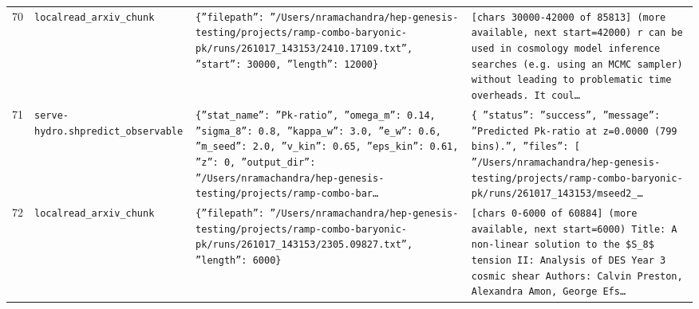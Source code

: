 \documentclass[11pt,a4paper]{article}
\begin{document}
\begin{longtable}{@{}p{}p{}p{}p{}@{}}
70 & \texttt{local}\newline\texttt{read\_\allowbreak{}arxiv\_\allowbreak{}chunk} & \texttt{\{''filepath'':\allowbreak{} ''/\allowbreak{}Users/\allowbreak{}nramachandra/\allowbreak{}hep-genesis-testing/\allowbreak{}projects/\allowbreak{}ramp-combo-baryonic-pk/\allowbreak{}runs/\allowbreak{}261017\_\allowbreak{}143153/\allowbreak{}2410.17109.txt'',\allowbreak{} ''start'':\allowbreak{} 30000,\allowbreak{} ''length'':\allowbreak{} 12000\}\allowbreak{}} & \texttt{[chars 30000-42000 of 85813]\allowbreak{} (more available,\allowbreak{} next start=\allowbreak{}42000)\allowbreak{}  r can be used in cosmology model inference searches (e.g. using an MCMC sampler)\allowbreak{} without leading to problematic time overheads. It coul\ldots{}\allowbreak{}} \\
71 & \texttt{serve-hydro.sh}\newline\texttt{predict\_\allowbreak{}observable} & \texttt{\{''stat\_\allowbreak{}name'':\allowbreak{} ''Pk-ratio'',\allowbreak{} ''omega\_\allowbreak{}m'':\allowbreak{} 0.14,\allowbreak{} ''sigma\_\allowbreak{}8'':\allowbreak{} 0.8,\allowbreak{} ''kappa\_\allowbreak{}w'':\allowbreak{} 3.0,\allowbreak{} ''e\_\allowbreak{}w'':\allowbreak{} 0.6,\allowbreak{} ''m\_\allowbreak{}seed'':\allowbreak{} 2.0,\allowbreak{} ''v\_\allowbreak{}kin'':\allowbreak{} 0.65,\allowbreak{} ''eps\_\allowbreak{}kin'':\allowbreak{} 0.61,\allowbreak{} ''z'':\allowbreak{} 0,\allowbreak{} ''output\_\allowbreak{}dir'':\allowbreak{} ''/\allowbreak{}Users/\allowbreak{}nramachandra/\allowbreak{}hep-genesis-testing/\allowbreak{}projects/\allowbreak{}ramp-combo-bar\ldots{}\allowbreak{}} & \texttt{\{   ''status'':\allowbreak{} ''success'',\allowbreak{}   ''message'':\allowbreak{} ''Predicted Pk-ratio at z=\allowbreak{}0.0000 (799 bins)\allowbreak{}.'',\allowbreak{}   ''files'':\allowbreak{} [     ''/\allowbreak{}Users/\allowbreak{}nramachandra/\allowbreak{}hep-genesis-testing/\allowbreak{}projects/\allowbreak{}ramp-combo-baryonic-pk/\allowbreak{}runs/\allowbreak{}261017\_\allowbreak{}143153/\allowbreak{}mseed2\_\allowbreak{}\ldots{}\allowbreak{}} \\
72 & \texttt{local}\newline\texttt{read\_\allowbreak{}arxiv\_\allowbreak{}chunk} & \texttt{\{''filepath'':\allowbreak{} ''/\allowbreak{}Users/\allowbreak{}nramachandra/\allowbreak{}hep-genesis-testing/\allowbreak{}projects/\allowbreak{}ramp-combo-baryonic-pk/\allowbreak{}runs/\allowbreak{}261017\_\allowbreak{}143153/\allowbreak{}2305.09827.txt'',\allowbreak{} ''length'':\allowbreak{} 6000\}\allowbreak{}} & \texttt{[chars 0-6000 of 60884]\allowbreak{} (more available,\allowbreak{} next start=\allowbreak{}6000)\allowbreak{}  Title:\allowbreak{} A non-linear solution to the \$S\_\allowbreak{}8\$ tension II:\allowbreak{} Analysis of DES Year 3 cosmic shear Authors:\allowbreak{} Calvin Preston,\allowbreak{} Alexandra Amon,\allowbreak{} George Efs\ldots{}\allowbreak{}} \\

\end{longtable}
\end{document}
